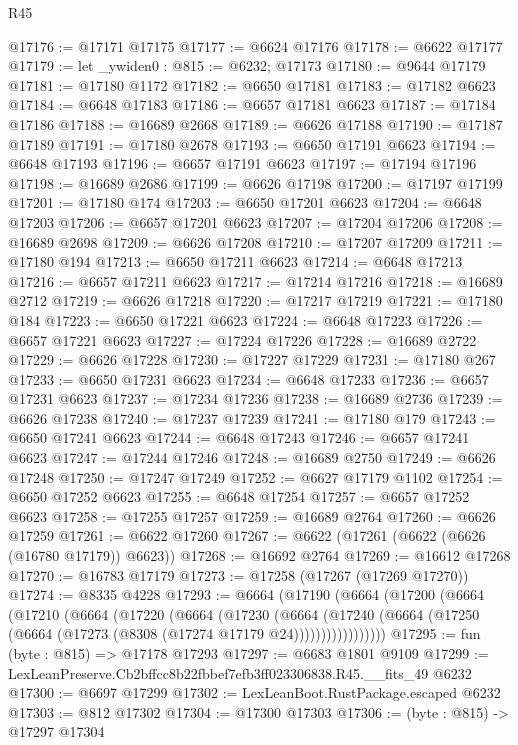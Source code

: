 \begin{lexlean}{R45}
\begin{coremodule}
{@17176 := @17171 @17175
@17177 := @6624 @17176
@17178 := @6622 @17177
@17179 := let _ywiden0 : @815 := @6232; @17173
@17180 := @9644 @17179
@17181 := @17180 @1172
@17182 := @6650 @17181
@17183 := @17182 @6623
@17184 := @6648 @17183
@17186 := @6657 @17181 @6623
@17187 := @17184 @17186
@17188 := @16689 @2668
@17189 := @6626 @17188
@17190 := @17187 @17189
@17191 := @17180 @2678
@17193 := @6650 @17191 @6623
@17194 := @6648 @17193
@17196 := @6657 @17191 @6623
@17197 := @17194 @17196
@17198 := @16689 @2686
@17199 := @6626 @17198
@17200 := @17197 @17199
@17201 := @17180 @174
@17203 := @6650 @17201 @6623
@17204 := @6648 @17203
@17206 := @6657 @17201 @6623
@17207 := @17204 @17206
@17208 := @16689 @2698
@17209 := @6626 @17208
@17210 := @17207 @17209
@17211 := @17180 @194
@17213 := @6650 @17211 @6623
@17214 := @6648 @17213
@17216 := @6657 @17211 @6623
@17217 := @17214 @17216
@17218 := @16689 @2712
@17219 := @6626 @17218
@17220 := @17217 @17219
@17221 := @17180 @184
@17223 := @6650 @17221 @6623
@17224 := @6648 @17223
@17226 := @6657 @17221 @6623
@17227 := @17224 @17226
@17228 := @16689 @2722
@17229 := @6626 @17228
@17230 := @17227 @17229
@17231 := @17180 @267
@17233 := @6650 @17231 @6623
@17234 := @6648 @17233
@17236 := @6657 @17231 @6623
@17237 := @17234 @17236
@17238 := @16689 @2736
@17239 := @6626 @17238
@17240 := @17237 @17239
@17241 := @17180 @179
@17243 := @6650 @17241 @6623
@17244 := @6648 @17243
@17246 := @6657 @17241 @6623
@17247 := @17244 @17246
@17248 := @16689 @2750
@17249 := @6626 @17248
@17250 := @17247 @17249
@17252 := @6627 @17179 @1102
@17254 := @6650 @17252 @6623
@17255 := @6648 @17254
@17257 := @6657 @17252 @6623
@17258 := @17255 @17257
@17259 := @16689 @2764
@17260 := @6626 @17259
@17261 := @6622 @17260
@17267 := @6622 (@17261 (@6622 (@6626 (@16780 @17179)) @6623))
@17268 := @16692 @2764
@17269 := @16612 @17268
@17270 := @16783 @17179
@17273 := @17258 (@17267 (@17269 @17270))
@17274 := @8335 @4228
@17293 := @6664
    (@17190
      (@6664
        (@17200
          (@6664
            (@17210
              (@6664
                (@17220
                  (@6664
                    (@17230
                      (@6664
                        (@17240
                          (@6664 (@17250 (@6664 (@17273 (@8308 (@17274 @17179 @24)))))))))))))))))
@17295 := fun (byte : @815) => @17178 @17293
@17297 := @6683 @1801 @9109
@17299 := LexLeanPreserve.Cb2bffcc8b22fbbef7efb3ff023306838.R45.__fits_49 @6232
@17300 := @6697 @17299
@17302 := LexLeanBoot.RustPackage.escaped @6232
@17303 := @812 @17302
@17304 := @17300 @17303
@17306 := (byte : @815) -> @17297 @17304
}
\end{coremodule}
\end{lexlean}
